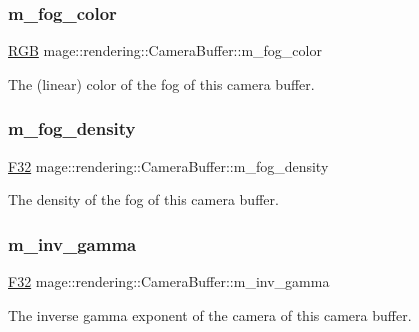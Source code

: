 \subsubsection{\texorpdfstring{m\+\_\+fog\+\_\+color}{m\_fog\_color}}
{\footnotesize\ttfamily \hyperlink{structmage_1_1_r_g_b}{R\+GB} mage\+::rendering\+::\+Camera\+Buffer\+::m\+\_\+fog\+\_\+color}

The (linear) color of the fog of this camera buffer. \hypertarget{structmage_1_1rendering_1_1_camera_buffer_aa9c3a305adfbeb717d480e822ed1c77e}{}\label{structmage_1_1rendering_1_1_camera_buffer_aa9c3a305adfbeb717d480e822ed1c77e} 
\subsubsection{\texorpdfstring{m\+\_\+fog\+\_\+density}{m\_fog\_density}}
{\footnotesize\ttfamily \hyperlink{namespacemage_aa97e833b45f06d60a0a9c4fc22ae02c0}{F32} mage\+::rendering\+::\+Camera\+Buffer\+::m\+\_\+fog\+\_\+density}

The density of the fog of this camera buffer. \hypertarget{structmage_1_1rendering_1_1_camera_buffer_a0ff45fc9f243d43fa43952b026900ade}{}\label{structmage_1_1rendering_1_1_camera_buffer_a0ff45fc9f243d43fa43952b026900ade} 
\subsubsection{\texorpdfstring{m\+\_\+inv\+\_\+gamma}{m\_inv\_gamma}}
{\footnotesize\ttfamily \hyperlink{namespacemage_aa97e833b45f06d60a0a9c4fc22ae02c0}{F32} mage\+::rendering\+::\+Camera\+Buffer\+::m\+\_\+inv\+\_\+gamma}

The inverse gamma exponent of the camera of this camera buffer. \hypertarget{structmage_1_1rendering_1_1_camera_buffer_a7915bec843e03ad2248c08b10317ccc7}{}\label{structmage_1_1rendering_1_1_camera_buffer_a7915bec843e03ad2248c08b10317ccc7} 
